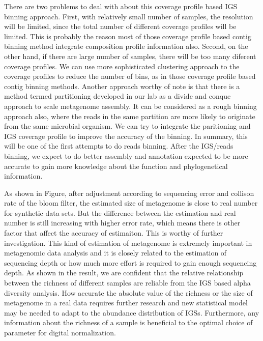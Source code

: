 There are two problems to deal with about this coverage profile based
IGS binning approach. First, with relatively small number of samples, the
resolution will be limited, since the total number of different coverage
profiles will be limited. This is probably the reason most of those coverage
profile based contig binning method integrate composition profile information
also. Second, on the other hand, if there are large number of samples, there
will be too many diferent coverage profiles. We can use more sophisticated
clustering approach to the coverage profiles to reduce the number of bins,
as in those coverage profile based contig binning methods. Another approach
worthy of note is that there is a method termed partitioning developed in
our lab as a divide and conque approach to scale metagenome assembly. It can be 
considered as a rough binning approach also, where the reads in the same
partition are more likely to originate from the same microbial organism. We can
try to integrate the paritioning and IGS coverage profile to improve the
accuracy of the binning. In summary, this will be one of the first attempts to
do reads binning. After the IGS/reads binning,  we expect to do better assembly
 and annotation expected to be more accurate to gain more knowledge about the
function and phylogenetical information.  

As shown in Figure, after adjustment according to sequencing error and collison
rate of the bloom filter, the estimated size of metagenome is close to real
number for synthetic data sets. But the difference between the estimation and
real number is still increasing with higher error rate, which means there is
other factor that affect the accuracy of estimaiton. This is worthy of further
investigation. This kind of estimation of metagenome is extremely important in
metagenomic data analysis and it is closely related to the estimation of
sequencing depth or how much more effort is required to gain enough sequencing
depth. As shown in the result, we are confident that the relative relationship 
between the richness of different samples are reliable from the IGS based alpha
diversity analysis. How accurate the absolute value of the richness or the size
of metagenome in a real data requires further research and new  
statistical model may be needed to adapt to the abundance distribution of IGSs.    
Furthermore, any information about the richness of a sample is beneficial to
the optimal choice of parameter for digital normalization.

